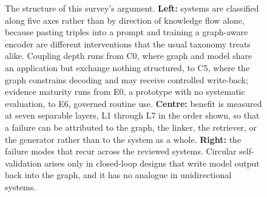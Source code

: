 \begin{figure}[!t]
{%
}
\caption{The structure of this survey's argument. \textbf{Left:} systems are classified along five axes rather than by direction of knowledge flow alone, because pasting triples into a prompt and training a graph-aware encoder are different interventions that the usual taxonomy treats alike. Coupling depth runs from C0, where graph and model share an application but exchange nothing structured, to C5, where the graph constrains decoding and may receive controlled write-back; evidence maturity runs from E0, a prototype with no systematic evaluation, to E6, governed routine use. \textbf{Centre:} benefit is measured at seven separable layers, L1 through L7 in the order shown, so that a failure can be attributed to the graph, the linker, the retriever, or the generator rather than to the system as a whole. \textbf{Right:} the failure modes that recur across the reviewed systems. Circular self-validation arises only in closed-loop designs that write model output back into the graph, and it has no analogue in unidirectional systems.}
\label{fig:abstract}
\end{figure}
